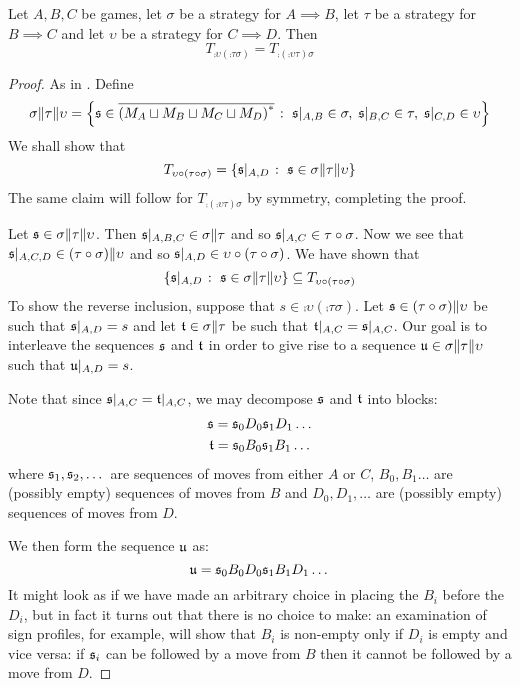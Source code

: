 \documentclass{entcs} \usepackage{prentcsmacro}
\newcommand{\0}{{\mathtt{0}}}
\begin{document}
\begin{proposition}\label{traceAssociativity}
  Let $A,B,C$ be games, let $\sigma$ be a strategy for $A\implies B$, let $\tau$ be a strategy for $B\implies C$ and let $\upsilon$ be a strategy for $C\implies D$.  Then
  \[
    T_{\comp{\upsilon}{(\comp\tau\sigma)}} = T_{\comp{(\comp\upsilon\tau)}{\sigma}}
    \]

\end{proposition}
  \begin{proof}
    As in \cite{abramskyjagadeesangames}.  Define
    \[
      \sigma\|\tau\|\upsilon = \left\{\mathfrak s\in{\overline{{(M_A \sqcup M_B \sqcup M_C \sqcup M_D)}^{*}}} \;\colon\; \mathfrak s\vert_{A,B}\in\sigma,\;\mathfrak s\vert_{B,C}\in\tau,\;\mathfrak s\vert_{C,D}\in\upsilon\right\}
      \]
    We shall show that 
    \[
      T_{\upsilon \circ (\tau \circ \sigma)} = \{\mathfrak s\vert_{A,D}\;\colon\;\mathfrak s\in\sigma\|\tau\|\upsilon\}
      \]
    The same claim will follow for $T_{\comp{(\comp{\upsilon}{\tau})}{\sigma}}$ by symmetry, completing the proof.

    Let $\mathfrak s\in\sigma\|\tau\|\upsilon$.  Then $\mathfrak s\vert_{A,B,C}\in\sigma\|\tau$ and so $\mathfrak s\vert_{A,C}\in\tau \circ \sigma$.  Now we see that $\mathfrak s\vert_{A,C,D}\in (\tau \circ \sigma)\|\upsilon$ and so $\mathfrak s\vert_{A,D}\in\upsilon \circ (\tau \circ \sigma)$.  We have shown that
    \[
      \{\mathfrak s\vert_{A,D}\;\colon\;\mathfrak s\in\sigma\|\tau\|\upsilon\} \subseteq T_{\upsilon \circ (\tau \circ \sigma)}
      \]
    To show the reverse inclusion, suppose that $s\in\comp{\upsilon}{(\comp\tau\sigma)}$.  Let $\mathfrak s\in(\tau \circ \sigma)\|\upsilon$ be such that $\mathfrak s\vert_{A,D}=s$ and let $\mathfrak t\in\sigma\|\tau$ be such that $\mathfrak t\vert_{A,C}=\mathfrak s\vert_{A,C}$.  Our goal is to interleave the sequences $\mathfrak s$ and $\mathfrak t$ in order to give rise to a sequence $\mathfrak u\in\sigma\|\tau\|\upsilon$ such that $\mathfrak u\vert_{A,D}=s$.  

    Note that since $\mathfrak s\vert_{A,C}=\mathfrak t\vert_{A,C}$, we may decompose $\mathfrak s$ and $\mathfrak t$ into blocks:
    \begin{gather*}
      \mathfrak s = \mathfrak s_0D_0\mathfrak s_1D_1\dots\\
      \mathfrak t = \mathfrak s_0B_0\mathfrak s_1B_1\dots
    \end{gather*}
    where $\mathfrak s_1,\mathfrak s_2,\dots$ are sequences of moves from either $A$ or $C$, $B_0,B_1\dots$ are (possibly empty) sequences of moves from $B$ and $D_0,D_1,\dots$ are (possibly empty) sequences of moves from $D$.

    We then form the sequence $\mathfrak u$ as:
    \[
      \mathfrak u = \mathfrak s_0B_0D_0\mathfrak s_1B_1D_1\dots
      \]
    It might look as if we have made an arbitrary choice in placing the $B_i$ before the $D_i$, but in fact it turns out that there is no choice to make: an examination of sign profiles, for example, will show that $B_i$ is non-empty only if $D_i$ is empty and vice versa: if $\mathfrak s_i$ can be followed by a move from $B$ then it cannot be followed by a move from $D$.


\end{proof}
\end{document}
